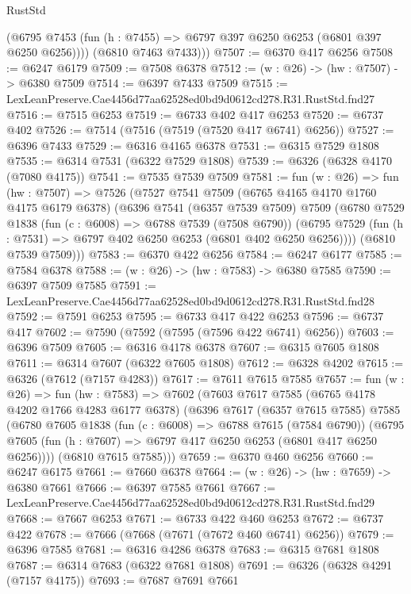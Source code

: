 \begin{lexlean}{RustStd}
\begin{coremodule}
          (@6795 @7453 (fun (h : @7455) => @6797 @397 @6250 @6253 (@6801 @397 @6250 @6256))))
        (@6810 @7463 @7433)))
@7507 := @6370 @417 @6256
@7508 := @6247 @6179
@7509 := @7508 @6378
@7512 := (w : @26) -> (hw : @7507) -> @6380 @7509
@7514 := @6397 @7433 @7509
@7515 := LexLeanPreserve.Cae4456d77aa62528ed0bd9d0612cd278.R31.RustStd.fnd27
@7516 := @7515 @6253
@7519 := @6733 @402 @417 @6253
@7520 := @6737 @402
@7526 := @7514 (@7516 (@7519 (@7520 @417 @6741) @6256))
@7527 := @6396 @7433
@7529 := @6316 @4165 @6378
@7531 := @6315 @7529 @1808
@7535 := @6314 @7531 (@6322 @7529 @1808)
@7539 := @6326 (@6328 @4170 (@7080 @4175))
@7541 := @7535 @7539 @7509
@7581 := fun (w : @26) =>
  fun (hw : @7507) =>
  @7526
    (@7527
      @7541
      @7509
      (@6765 @4165 @4170 @1760 @4175 @6179 @6378)
      (@6396
        @7541
        (@6357 @7539 @7509)
        @7509
        (@6780
          @7529
          @1838
          (fun (c : @6008) => @6788 @7539 (@7508 @6790))
          (@6795 @7529 (fun (h : @7531) => @6797 @402 @6250 @6253 (@6801 @402 @6250 @6256))))
        (@6810 @7539 @7509)))
@7583 := @6370 @422 @6256
@7584 := @6247 @6177
@7585 := @7584 @6378
@7588 := (w : @26) -> (hw : @7583) -> @6380 @7585
@7590 := @6397 @7509 @7585
@7591 := LexLeanPreserve.Cae4456d77aa62528ed0bd9d0612cd278.R31.RustStd.fnd28
@7592 := @7591 @6253
@7595 := @6733 @417 @422 @6253
@7596 := @6737 @417
@7602 := @7590 (@7592 (@7595 (@7596 @422 @6741) @6256))
@7603 := @6396 @7509
@7605 := @6316 @4178 @6378
@7607 := @6315 @7605 @1808
@7611 := @6314 @7607 (@6322 @7605 @1808)
@7612 := @6328 @4202
@7615 := @6326 (@7612 (@7157 @4283))
@7617 := @7611 @7615 @7585
@7657 := fun (w : @26) =>
  fun (hw : @7583) =>
  @7602
    (@7603
      @7617
      @7585
      (@6765 @4178 @4202 @1766 @4283 @6177 @6378)
      (@6396
        @7617
        (@6357 @7615 @7585)
        @7585
        (@6780
          @7605
          @1838
          (fun (c : @6008) => @6788 @7615 (@7584 @6790))
          (@6795 @7605 (fun (h : @7607) => @6797 @417 @6250 @6253 (@6801 @417 @6250 @6256))))
        (@6810 @7615 @7585)))
@7659 := @6370 @460 @6256
@7660 := @6247 @6175
@7661 := @7660 @6378
@7664 := (w : @26) -> (hw : @7659) -> @6380 @7661
@7666 := @6397 @7585 @7661
@7667 := LexLeanPreserve.Cae4456d77aa62528ed0bd9d0612cd278.R31.RustStd.fnd29
@7668 := @7667 @6253
@7671 := @6733 @422 @460 @6253
@7672 := @6737 @422
@7678 := @7666 (@7668 (@7671 (@7672 @460 @6741) @6256))
@7679 := @6396 @7585
@7681 := @6316 @4286 @6378
@7683 := @6315 @7681 @1808
@7687 := @6314 @7683 (@6322 @7681 @1808)
@7691 := @6326 (@6328 @4291 (@7157 @4175))
@7693 := @7687 @7691 @7661

\end{coremodule}
\end{lexlean}
